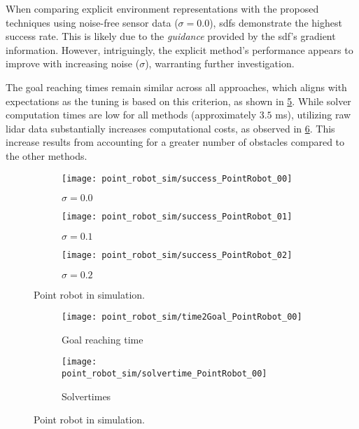 When comparing explicit environment representations with the proposed techniques
using noise-free sensor data ($\sigma=0.0$), \acp{sdf} demonstrate the highest
success rate. This is likely due to the \textit{guidance} provided by the
\ac{sdf}'s gradient information. However, intriguingly, the explicit method's
performance appears to improve with increasing noise ($\sigma$), warranting
further investigation.

The goal reaching times remain similar across all approaches, which aligns with
expectations as the tuning is based on this criterion, as shown in
\cref{subfig:point_robot_sim_time2Goal}. While solver computation times are low
for all methods (approximately $3.5$ ms), utilizing raw lidar data substantially
increases computational costs, as observed in
\cref{subfig:point_robot_sim_solvertimes}. This increase results from accounting
for a greater number of obstacles compared to the other methods.


\begin{figure}[ht]
  \centering
  \begin{subfigure}{0.33\linewidth}
    \centering
  \texttt{[image: point\_robot\_sim/success\_PointRobot\_00]}
    \caption{$\sigma = 0.0$}%
    \label{subfig:point_robot_sim_sucess_noise_00}
  \end{subfigure}%
  \begin{subfigure}{0.33\linewidth}
    \centering
    \texttt{[image: point\_robot\_sim/success\_PointRobot\_01]}
    \caption{$\sigma=0.1$}%
    \label{subfig:point_robot_sim_success_noise_01}
  \end{subfigure}%
  \begin{subfigure}{0.33\linewidth}
    \centering
    \texttt{[image: point\_robot\_sim/success\_PointRobot\_02]}
    \caption{$\sigma=0.2$}%
    \label{subfig:point_robot_sim_success_noise_02}
  \end{subfigure}%
  \caption{Point robot in simulation.
  }%
  \label{fig:point_robot_sim_success}
\end{figure}

\begin{figure}[ht]
  \centering
  \begin{subfigure}{0.5\linewidth}
    \centering
  \texttt{[image: point\_robot\_sim/time2Goal\_PointRobot\_00]}
    \caption{Goal reaching time}%
    \label{subfig:point_robot_sim_time2Goal}
  \end{subfigure}%
  \begin{subfigure}{0.5\linewidth}
    \centering
    \texttt{[image: point\_robot\_sim/solvertime\_PointRobot\_00]}
    \caption{Solvertimes}%
    \label{subfig:point_robot_sim_solvertimes}
  \end{subfigure}%
  \caption{Point robot in simulation.
  }%
  \label{fig:point_robot_sim_metrics}
\end{figure}

